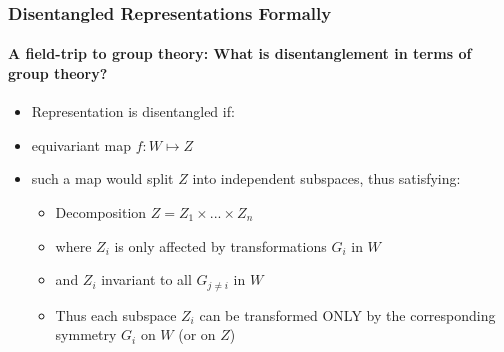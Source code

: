 \documentclass[9pt]{beamer}
\begin{document}
\begin{frame}
\frametitle{Disentangled Representations Formally}
\framesubtitle{A field-trip to group theory: What is disentanglement in terms of group theory?}
\begin{itemize}%
	\item Representation is disentangled if:
		\item equivariant map $f:W \mapsto Z$%
		\item such a map would split $Z$ into independent subspaces, thus satisfying:
		\begin{itemize}
			\item Decomposition $Z = Z_{1} \times ... \times Z_{n}$
			\item where $Z_{i}$ is only affected by transformations $G_i$ in $W$%
			\item and $Z_i$ invariant to all $G_{j \neq i}$ in $W$ %
			\item Thus each subspace $Z_i$ can be transformed ONLY by the corresponding symmetry $G_i$ on $W$ (or on $Z$)%
		\end{itemize}
\end{itemize}
\end{frame} 
\end{document}
